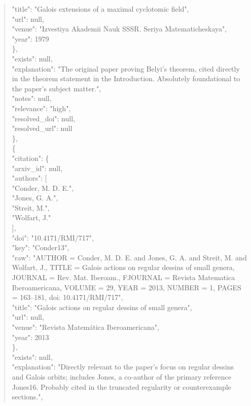 \documentclass[11pt]{article}
\begin{document}
\begin{quote}
        "title": "Galois extensions of a maximal cyclotomic field",\\
        "url": null,\\
        "venue": "Izvestiya Akademii Nauk SSSR. Seriya Matematicheskaya",\\
        "year": 1979\\
      \},\\
      "exists": null,\\
      "explanation": "The original paper proving Belyi's theorem, cited directly in the theorem statement in the Introduction. Absolutely foundational to the paper's subject matter.",\\
      "notes": null,\\
      "relevance": "high",\\
      "resolved\_doi": null,\\
      "resolved\_url": null\\
    \},\\
    \{\\
      "citation": \{\\
        "arxiv\_id": null,\\
        "authors": [\\
          "Conder, M. D. E.",\\
          "Jones, G. A.",\\
          "Streit, M.",\\
          "Wolfart, J."\\
        ],\\
        "doi": "10.4171/RMI/717",\\
        "key": "Conder13",\\
        "raw": "AUTHOR = Conder, M. D. E. and Jones, G. A. and Streit, M. and Wolfart, J., TITLE = Galois actions on regular dessins of small genera, JOURNAL = Rev. Mat. Iberoam., FJOURNAL = Revista Matematica Iberoamericana, VOLUME = 29, YEAR = 2013, NUMBER = 1, PAGES = 163--181, doi: 10.4171/RMI/717",\\
        "title": "Galois actions on regular dessins of small genera",\\
        "url": null,\\
        "venue": "Revista Matemática Iberoamericana",\\
        "year": 2013\\
      \},\\
      "exists": null,\\
      "explanation": "Directly relevant to the paper's focus on regular dessins and Galois orbits; includes Jones, a co-author of the primary reference Jones16. Probably cited in the truncated regularity or counterexample sections.",\\

\end{quote}
\end{document}
